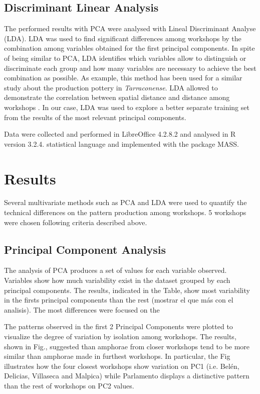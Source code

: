 \documentclass[review]{elsarticle}
\begin{document}

\subsection{Discriminant Linear Analysis} 


The performed results with PCA were analysed with Lineal Discriminant Analyse (LDA). LDA was used to find significant differences among workshops by the combination among variables obtained for the first principal components. In spite of being similar to PCA, LDA identifies which variables allow to distinguish or discriminate each group and how many variables are necessary to achieve the best combination as possible. As example, this method has been used for a similar study about the production pottery in \emph{Tarraconense}. LDA allowed to demonstrate the correlation between spatial distance and distance among workshops \citep{i_martin_alisis_1998}. In our case, LDA was used to explore a better separate training set from the results of the most relevant principal components. 


Data were collected and performed in LibreOffice 4.2.8.2 and analysed in R version 3.2.4. statistical language and implemented with the package MASS. 

\section{Results}

Several multivariate methods such as PCA and LDA were used to quantify the technical differences on the pattern production among workshops. 5 workshops were chosen following criteria described above. 


\subsection{Principal Component Analysis}

The analysis of PCA produces a set of values for each variable observed. Variables show how much variability exist in the dataset grouped by each principal components. The results, indicated in the Table, show most variability in the firsts principal components than the rest (mostrar el que más con el analisis).
The most differences were focused on the %

The patterns observed in the first 2 Principal Components were plotted to visualize the degree of variation by isolation among workshops. The results, shown in Fig., suggested than amphorae from closer workshops tend to be more similar than amphorae made in furthest workshops. In particular, the Fig illustrates how the four closest workshops show variation on PC1 (i.e. Belén, Delicias, Villaseca and Malpica) while Parlamento displays a distinctive pattern than the rest of workshops on PC2 values. 
\end{document}
